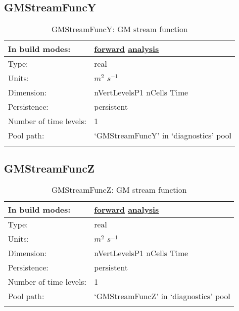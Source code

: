 \subsection[GMStreamFuncY]{GMStreamFuncY}
\label{subsec:var_sec_diagnostics_GMStreamFuncY}
\begin{center}
\begin{longtable}{| p{2.0in} | p{4.0in} |}
        \hline 
        In build modes: & \hyperref[subsec:forward_var_tab_diagnostics]{forward} \hyperref[subsec:analysis_var_tab_diagnostics]{analysis} \\
        \hline 
        Type: & real \\
        \hline 
        Units: & $m^2$ $s^{-1}$ \\
        \hline 
        Dimension: & nVertLevelsP1 nCells Time \\
        \hline 
        Persistence: & persistent \\
        \hline 
        Number of time levels: & 1 \\
        \hline 
            Pool path: & `GMStreamFuncY' in `diagnostics' pool \\
		 \hline 
    \caption{GMStreamFuncY: GM stream function}
\end{longtable}
\end{center}
\subsection[GMStreamFuncZ]{GMStreamFuncZ}
\label{subsec:var_sec_diagnostics_GMStreamFuncZ}
\begin{center}
\begin{longtable}{| p{2.0in} | p{4.0in} |}
        \hline 
        In build modes: & \hyperref[subsec:forward_var_tab_diagnostics]{forward} \hyperref[subsec:analysis_var_tab_diagnostics]{analysis} \\
        \hline 
        Type: & real \\
        \hline 
        Units: & $m^2$ $s^{-1}$ \\
        \hline 
        Dimension: & nVertLevelsP1 nCells Time \\
        \hline 
        Persistence: & persistent \\
        \hline 
        Number of time levels: & 1 \\
        \hline 
            Pool path: & `GMStreamFuncZ' in `diagnostics' pool \\
		 \hline 
    \caption{GMStreamFuncZ: GM stream function}
\end{longtable}
\end{center}

